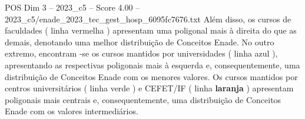 \begin{textsample}{POS Dim 3 – 2023\_c5 – Score 4.00 – 2023\_c5/enade\_2023\_tec\_gest\_hosp\_6095fc7676.txt}
Além disso, os cursos de faculdades ( linha vermelha ) apresentam uma poligonal mais à direita do que as demais, denotando uma melhor distribuição de Conceitos Enade.
No outro extremo, encontram -se os cursos mantidos por universidades ( linha azul ), apresentando as respectivas poligonais mais à esquerda e, consequentemente, uma distribuição de Conceitos Enade com os menores valores.
Os cursos mantidos por centros universitários ( linha verde ) e CEFET/IF ( linha \textbf{laranja} ) apresentam poligonais mais centrais e, consequentemente, uma distribuição de Conceitos Enade com os valores intermediários.

\end{textsample}
